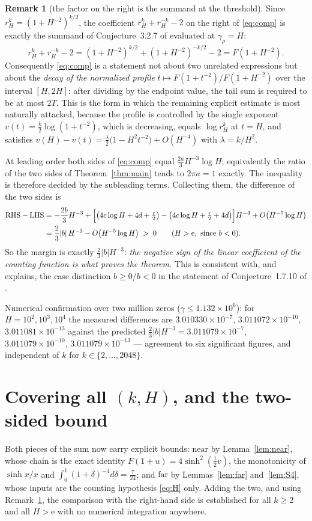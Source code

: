 \documentclass[11pt]{article}
\theoremstyle{definition}
\newtheorem{remark}[theorem]{Remark}
\newcommand{\e}{\mathrm{e}}
\begin{document}
\begin{remark}[the factor on the right is the summand at the threshold]\label{rem:endo}
Since $r_H^{k}=(1+H^{-2})^{k/2}$, the coefficient $r_H^{k}+r_H^{-k}-2$ on the right of
\eqref{eq:comp} is exactly the summand of Conjecture~3.2.7 of \cite{Dr12} evaluated at $\gamma_\rho=H$:
\[
r_H^{k}+r_H^{-k}-2=(1+H^{-2})^{k/2}+(1+H^{-2})^{-k/2}-2=F(1+H^{-2}).
\]
Consequently \eqref{eq:comp} is a statement not about two unrelated expressions but about the
\emph{decay of the normalized profile} $t\mapsto F(1+t^{-2})/F(1+H^{-2})$ over the interval
$[H,2H]$: after dividing by the endpoint value, the tail sum is required to be at most $2T$. This is
the form in which the remaining explicit estimate is most naturally attacked, because the profile is
controlled by the single exponent $v(t)=\frac k2\log(1+t^{-2})$, which is decreasing, equals
$\log r_H^{k}$ at $t=H$, and satisfies $v(H)-v(t)=\frac\lambda2\bigl(1-H^{2}t^{-2}\bigr)+O(H^{-4})$ with
$\lambda=k/H^{2}$.
\end{remark}

At leading order both sides of \eqref{eq:comp} equal $\frac{2a}3H^{-3}\log H$; equivalently the ratio of
the two sides of Theorem~\ref{thm:main} tends to $2\pi a=1$ exactly. The inequality is therefore decided
by the subleading terms. Collecting them, the difference of the two sides is
\begin{align*}
\mathrm{RHS}-\mathrm{LHS}
&=-\frac{2b}3H^{-3}
+\Bigl[\bigl(4c\log H+4d+\tfrac c2\bigr)-\bigl(4c\log H+\tfrac c2+4d\bigr)\Bigr]H^{-4}
+O\bigl(H^{-5}\log H\bigr)\\
&=\frac23|b|\,H^{-3}-O\bigl(H^{-5}\log H\bigr)\;>\;0\qquad(H>\e,\ \text{since }b<0).
\end{align*}
So the margin is exactly $\tfrac23|b|H^{-3}$: \emph{the negative sign of the linear coefficient of the
counting function is what proves the theorem.} This is consistent with, and explains, the case
distinction $b\ge0$/$b<0$ in the statement of Conjecture~1.7.10 of \cite{Dr12}.

Numerical confirmation over two million zeros ($\gamma\le1.132\times10^{6}$): for $H=10^{2},10^{3},10^{4}$
the measured differences are $3.010330\times10^{-7}$, $3.011072\times10^{-10}$, $3.011081\times10^{-13}$
against the predicted $\tfrac23|b|H^{-3}=3.011079\times10^{-7}$, $3.011079\times10^{-10}$,
$3.011079\times10^{-13}$ --- agreement to six significant figures, and independent of $k$ for
$k\in\{2,\ldots,2048\}$.

\section{Covering all $(k,H)$, and the two-sided bound}\label{sec:cover}
Both pieces of the sum now carry explicit bounds: $\mathrm{near}$ by Lemma~\ref{lem:near}, whose chain
is the exact identity $F(1+u)=4\sinh^{2}(\tfrac12 v)$, the monotonicity of $\sinh x/x$ and
$\int_0^{1}(1+\delta)^{-4}d\delta=\tfrac7{24}$; and $\mathrm{far}$ by Lemmas~\ref{lem:far}
and~\ref{lem:S4}, whose inputs are the counting hypothesis \eqref{eq:H} only. Adding the two, and using
Remark~\ref{rem:endo}, the comparison with the right-hand side is established for all $k\ge2$ and all
$H>\e$ with no numerical integration anywhere.
\end{document}
